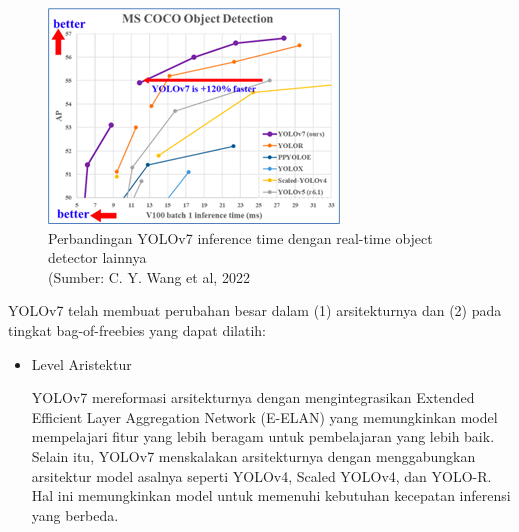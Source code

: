 \begin{enumerate}
	\begin{figure}[H]
		\vspace{-0.1cm}
		\begin{center}
			\includegraphics[width=1\columnwidth]{bab2/Gambar/Picture42.png}
		\end{center}
		\vspace{-0.2cm}
		\captionsetup{justification=centering}
		\caption{Perbandingan YOLOv7 inference time dengan real-time object detector lainnya\\(Sumber: C. Y. Wang et al, 2022}\label{img:Performance-YOLOv7}
	\end{figure}
	YOLOv7 telah membuat perubahan besar dalam (1) arsitekturnya dan (2) pada tingkat bag-of-freebies yang dapat dilatih:
	
	\begin{itemize}
		\item Level Aristektur
		
		YOLOv7 mereformasi arsitekturnya dengan mengintegrasikan Extended Efficient Layer Aggregation Network (E-ELAN) yang memungkinkan model mempelajari fitur yang lebih beragam untuk pembelajaran yang lebih baik.\\
		Selain itu, YOLOv7 menskalakan arsitekturnya dengan menggabungkan arsitektur model asalnya seperti YOLOv4, Scaled YOLOv4, dan YOLO-R. Hal ini memungkinkan model untuk memenuhi kebutuhan kecepatan inferensi yang berbeda.
		

\end{itemize}
\end{enumerate}
